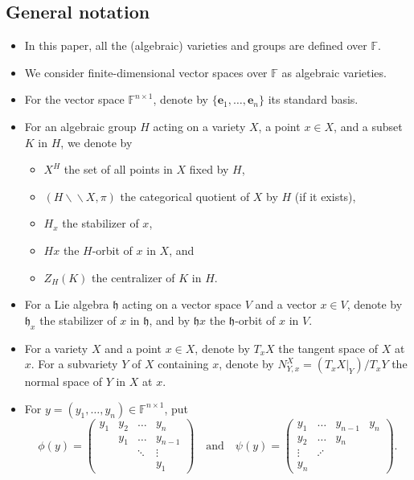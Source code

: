 \documentclass[12pt]{amsart}
\theoremstyle{definition}
\theoremstyle{remark}\newtheorem{rmk}[lm]{Remark}
\newcommand{\h}{\mathfrak h}
\newcommand{\C}{\mathbb{F}}
\newcommand{\be}{\mathbf{e}}
\newcommand{\bac}{\backslash\!\!\backslash}
\begin{document}
\subsection{General notation}
\begin{itemize}
    \item  In this paper, all the (algebraic) varieties and 
groups are defined over $\C$.
\item We consider finite-dimensional vector spaces over $\C$ as algebraic varieties.
\item For the vector space $\C^{n\times 1}$, denote by $\{\be_1,\dots,\be_n\}$ its standard basis.
\item For an algebraic group $H$ acting on a variety $X$, a point $x\in X$, and a subset $K$ in $H$, we denote by
\begin{itemize}
\item  $X^H$ the set of all points in $X$ fixed by $H$,
\item $(H\bac X,\pi)$ the categorical quotient of $X$ by $H$ (if it exists), 
\item $H_x$ the stabilizer of $x$,
\item $Hx$ the $H$-orbit of $x$ in $X$, and
\item  $Z_H(K)$ the centralizer of $K$ in $H$.
\end{itemize}

\item For a Lie algebra $\h$ acting on a vector space $V$ and a vector $x\in V$, denote by $\h_x$ the stabilizer of $x$ in $\h$, and by $\h x$ the $\h$-orbit of $x$ in $V$.

\item For a variety $X$ and a point $x\in X$, denote by $T_xX$ the tangent space of $X$ at $x$. For a subvariety $Y$ of $X$ containing $x$, denote by $N_{Y,x}^X=(T_xX|_Y)/T_xY$ the normal space of $Y$ in $X$ at $x$.

\item For $y=(y_1,\dots,y_n)\in\C^{n\times 1}$, put
\begin{equation*}
	\phi(y)=\left(\begin{matrix}
		y_1&y_2&\dots&y_n\\
		&y_1&\dots&y_{n-1}\\
		&&\ddots&\vdots\\
		&&&y_1
	\end{matrix}\right)\quad\text{and}\quad\psi(y)=\left(\begin{matrix}
	    y_1&\dots&y_{n-1}&y_n\\
	    y_2&\dots&y_{n}&\\
	    \vdots&\iddots&&\\
	    y_n&&&
	\end{matrix}\right).
\end{equation*}
\end{itemize}
\end{document}
